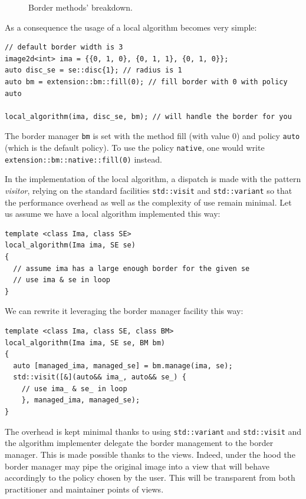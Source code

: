 \begin{figure}[htbp]
  \centering
  \hfil
  \hfil
  \hfil
  \hfil
  \hfil

  \caption{Border methods' breakdown.}
  \label{fig:border.all}
\end{figure}

As a consequence the usage of a local algorithm becomes very simple:

\begin{verbatim}
// default border width is 3
image2d<int> ima = {{0, 1, 0}, {0, 1, 1}, {0, 1, 0}};
auto disc_se = se::disc{1}; // radius is 1
auto bm = extension::bm::fill(0); // fill border with 0 with policy auto

local_algorithm(ima, disc_se, bm); // will handle the border for you
\end{verbatim}

The border manager \texttt{bm} is set with the method fill (with value 0) and policy \texttt{auto} (which is the default
policy). To use the policy \texttt{native}, one would write \texttt{extension::bm::native::fill(0)} instead.

In the implementation of the local algorithm, a dispatch is made with the pattern \emph{visitor}, relying on the
standard facilities \texttt{std::visit} and \texttt{std::variant} so that the performance overhead as well as the
complexity of use remain minimal. Let us assume we have a local algorithm implemented this way:
\begin{verbatim}
template <class Ima, class SE>
local_algorithm(Ima ima, SE se)
{
  // assume ima has a large enough border for the given se
  // use ima & se in loop
}
\end{verbatim}
We can rewrite it leveraging the border manager facility this way:
\begin{verbatim}
template <class Ima, class SE, class BM>
local_algorithm(Ima ima, SE se, BM bm)
{
  auto [managed_ima, managed_se] = bm.manage(ima, se);
  std::visit([&](auto&& ima_, auto&& se_) {
    // use ima_ & se_ in loop
    }, managed_ima, managed_se);
}
\end{verbatim}
The overhead is kept minimal thanks to using \texttt{std::variant} and \texttt{std::visit} and the algorithm implementer
delegate the border management to the border manager. This is made possible thanks to the views. Indeed, under the hood
the border manager may pipe the original image into a view that will behave accordingly to the policy chosen by the
user. This will be transparent from both practitioner and maintainer points of views.


